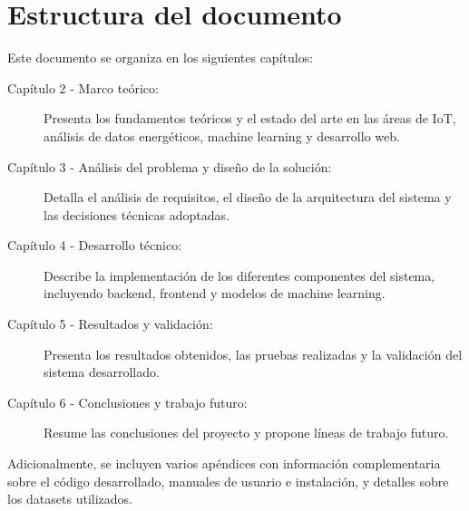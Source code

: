 \section{Estructura del documento}

Este documento se organiza en los siguientes capítulos:

\begin{description}
    \item[Capítulo 2 - Marco teórico:] Presenta los fundamentos teóricos y el estado del arte en las áreas de IoT, análisis de datos energéticos, machine learning y desarrollo web.
    
    \item[Capítulo 3 - Análisis del problema y diseño de la solución:] Detalla el análisis de requisitos, el diseño de la arquitectura del sistema y las decisiones técnicas adoptadas.
    
    \item[Capítulo 4 - Desarrollo técnico:] Describe la implementación de los diferentes componentes del sistema, incluyendo backend, frontend y modelos de machine learning.
    
    \item[Capítulo 5 - Resultados y validación:] Presenta los resultados obtenidos, las pruebas realizadas y la validación del sistema desarrollado.
    
    \item[Capítulo 6 - Conclusiones y trabajo futuro:] Resume las conclusiones del proyecto y propone líneas de trabajo futuro.
\end{description}

Adicionalmente, se incluyen varios apéndices con información complementaria sobre el código desarrollado, manuales de usuario e instalación, y detalles sobre los datasets utilizados.

